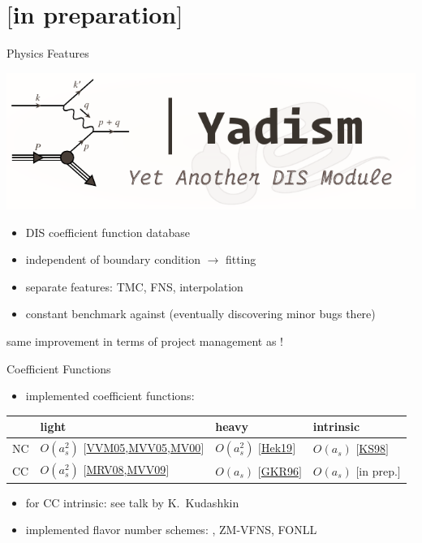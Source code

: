 \documentclass[10pt, usepdftitle=false]{beamer}
\providecommand{\iRef}[1]{{\color{mLightGreen}\small $[$#1$]$}}
\begin{document}
\section{\yadism{} \iRef{in preparation}}

\begin{frame}{\yadism{} Physics Features}
	\begin{center}
		\includegraphics[width=.4\linewidth]{yadism.pdf}
	\end{center}

	\begin{itemize}
		\item DIS coefficient function database
		\item independent of boundary condition $\to$ \pdf{} fitting
		\item separate features: TMC, FNS, interpolation
		\item constant benchmark against \apfel{} (eventually discovering minor bugs there)
	\end{itemize}

	\vspace{10pt}
	same improvement in terms of project management as \eko{}!
\end{frame}

\begin{frame}{Coefficient Functions}
	\begin{itemize}
		\item implemented coefficient functions:
	\end{itemize}
	\begin{center}
		\begin{tabular}{l|l|l|l}
			& light & heavy & intrinsic\\\hline
			NC & $O(a_s^2)$ \iRef{\href{https://doi.org/10.1016/j.nuclphysb.2005.06.020}{VVM05},\href{https://doi.org/10.1016/j.physletb.2004.11.063}{MVV05},\href{https://doi.org/10.1016/S0550-3213(00)00045-6}{MV00}} & $O(a_s^2)$ \iRef{\href{https://arxiv.org/abs/1910.01536}{Hek19}} & $O(a_s)$ \iRef{\href{https://doi.org/10.1103/PhysRevD.58.094035}{KS98}}\\
			CC & $O(a_s^2)$ \iRef{\href{https://doi.org/10.1016/j.nuclphysb.2007.09.022}{MRV08},\href{https://doi.org/10.1016/j.nuclphysb.2009.01.001}{MVV09}} & $O(a_s)$ \iRef{\href{https://doi.org/10.1016/0370-2693(96)00456-X}{GKR96}} & $O(a_s)$ \iRef{in prep.}
		\end{tabular}
	\end{center}
	\begin{itemize}
		\item for CC intrinsic: see talk by K.~Kudashkin
		\item implemented flavor number schemes: \ffns{}, {\abbrev ZM-VFNS}, {\abbrev FONLL}
	\end{itemize}
\end{frame}
\end{document}
